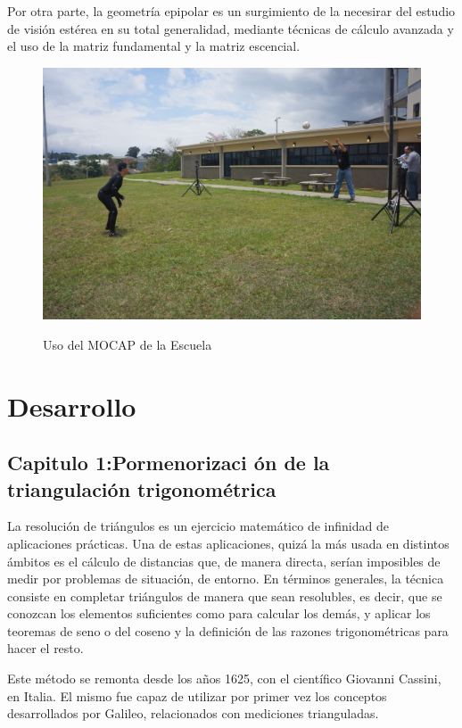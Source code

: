 \documentclass[11pt,letterpaper]{article}     %
\begin{document}
Por otra parte, la geometr\' ia epipolar es un surgimiento de la necesirar del estudio de visi\' on est\' erea en su total generalidad, mediante t\' ecnicas de c\' alculo avanzada y el uso de la matriz fundamental y la matriz escencial.

\begin{figure}[hbtp]
\caption{Uso del MOCAP de la Escuela}
\centering
\includegraphics[scale=0.25]{imagenes/1614262_755232877844886_6375624551639752710_o.jpg}
\label{fig:usoMOCAP}
\end{figure}



\section{Desarrollo}
\subsection{Capitulo 1:Pormenorizaci \'on de la triangulaci\' on trigonom\' etrica}
La resolución de triángulos es un ejercicio matemático de infinidad de aplicaciones prácticas. Una de estas aplicaciones, quizá la más usada en distintos ámbitos es el cálculo de distancias que, de manera directa, serían imposibles de medir por problemas de situación, de entorno. 
En t\' erminos generales, la t\' ecnica consiste en completar triángulos de manera que sean resolubles, es decir, que se conozcan los elementos suficientes como para calcular los demás, y aplicar los teoremas de seno o del coseno y la definición de las razones trigonométricas para hacer el resto. 

Este m\' etodo se remonta desde los a\~ nos 1625, con el cient\' ifico Giovanni Cassini, en Italia. El mismo fue capaz de utilizar por primer vez los conceptos desarrollados por Galileo, relacionados con mediciones trianguladas.
\end{document}
